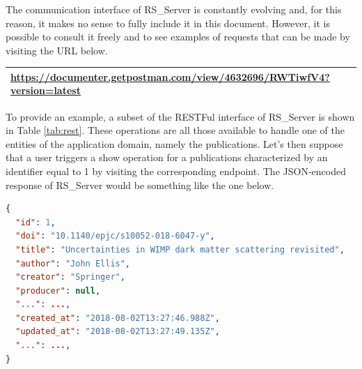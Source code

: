 \documentclass[a4paper, english]{article}
\begin{document}
The communication interface of RS\_Server is constantly evolving and, for this reason, it makes no sense to fully include it in this document. However, it is possible to consult it freely and to see examples of requests that can be made by visiting the URL below.

\begin{table}[h]
\centering
\begin{tabular}{p{12cm}}
  \toprule
	\url{https://documenter.getpostman.com/view/4632696/RWTiwfV4?version=latest}  \\
 \toprule
  \end{tabular}
\end{table}

To provide an example, a subset of the RESTFul interface of RS\_Server is shown in Table \ref{tab:rest}. These operations are all those available to handle one of the entities of the application domain, namely the publications. Let's then suppose that a user triggers a show operation for a publications characterized by an identifier equal to 1 by visiting the corresponding endpoint. The JSON-encoded response of RS\_Server would be something like the one below.

\begin{lstlisting}[language=json,firstnumber=1]
{
  "id": 1,
  "doi": "10.1140/epjc/s10052-018-6047-y",
  "title": "Uncertainties in WIMP dark matter scattering revisited",
  "author": "John Ellis",
  "creator": "Springer",
  "producer": null,
  "...": ...,
  "created_at": "2018-08-02T13:27:46.988Z",
  "updated_at": "2018-08-02T13:27:49.135Z",
  "...": ...,
}
\end{lstlisting}
\end{document}
